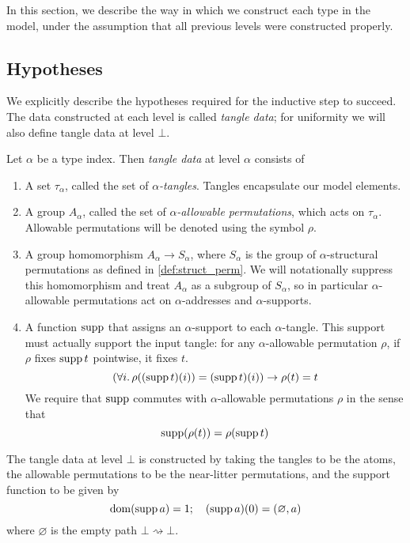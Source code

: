 In this section, we describe the way in which we construct each type in the model, under the assumption that all previous levels were constructed properly.

\subsection{Hypotheses}

We explicitly describe the hypotheses required for the inductive step to succeed.
The data constructed at each level is called \emph{tangle data}; for uniformity we will also define tangle data at level \( \bot \).

\begin{definition}
    Let \( \alpha \) be a type index.
    Then \emph{tangle data} at level \( \alpha \) consists of
    \begin{enumerate}
        \item A set \( \tau_\alpha \), called the set of \emph{\( \alpha \)-tangles}.
        Tangles encapsulate our model elements.
        \item A group \( A_\alpha \), called the set of \emph{\( \alpha \)-allowable permutations}, which acts on \( \tau_\alpha \).
        Allowable permutations will be denoted using the symbol \( \rho \).
        \item A group homomorphism \( A_\alpha \to S_\alpha \), where \( S_\alpha \) is the group of \( \alpha \)-structural permutations as defined in \cref{def:struct_perm}.
        We will notationally suppress this homomorphism and treat \( A_\alpha \) as a subgroup of \( S_\alpha \), so in particular \( \alpha \)-allowable permutations act on \( \alpha \)-addresses and \( \alpha \)-supports.
        \item A function \( \operatorname{supp} \) that assigns an \( \alpha \)-support to each \( \alpha \)-tangle.
        This support must actually support the input tangle: for any \( \alpha \)-allowable permutation \( \rho \), if \( \rho \) fixes \( \operatorname{supp} t \) pointwise, it fixes \( t \).
        \[ (\forall i.\, \rho((\operatorname{supp} t)(i)) = (\operatorname{supp} t)(i)) \to \rho(t) = t \]
        We require that \( \operatorname{supp} \) commutes with \( \alpha \)-allowable permutations \( \rho \) in the sense that
        \[ \operatorname{supp}(\rho(t)) = \rho(\operatorname{supp} t) \]
    \end{enumerate}
\end{definition}

The tangle data at level \( \bot \) is constructed by taking the tangles to be the atoms, the allowable permutations to be the near-litter permutations, and the support function to be given by
\[ \operatorname{dom}(\operatorname{supp} a) = 1;\quad (\operatorname{supp} a)(0) = (\varnothing, a) \]
where \( \varnothing \) is the empty path \( \bot \rightsquigarrow \bot \).


